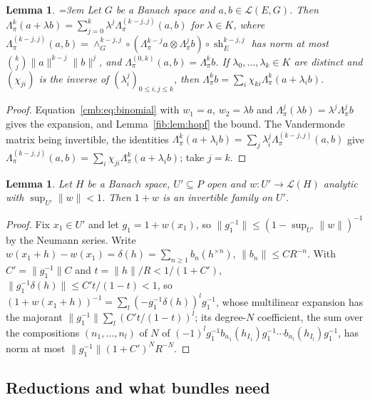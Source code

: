\documentclass[11pt]{amsart}
\newtheorem{lemma}[theorem]{Lemma}
\theoremstyle{definition}
\theoremstyle{remark}
\numberwithin{equation}{section}
\newcommand{\cL}{\mathcal L}
\newcommand{\norm}[1]{\lVert #1\rVert}
\theoremstyle{plain}
\theoremstyle{definition}
\theoremstyle{plain}
\newcommand{\sh}{\operatorname{sh}}
\begin{document}
\begin{lemma}\label{fmo:lem:vandermonde}\emergencystretch=3em
Let $G$ be a Banach space and $a,b\in\cL(E,G)$. Then $\Lambda^k_\pi(a+\lambda b)=\sum_{j=0}^k\lambda^j\Lambda^{(k-j,j)}_\pi
(a,b)$ for $\lambda\in K$, where $\Lambda^{(k-j,j)}_\pi(a,b)=\wedge^{k-j,j}_G\circ(\Lambda^{k-j}_\pi a\otimes\Lambda^j_\pi b)
\circ\sh^{k-j,j}_E$ has norm at most $\binom kj\norm a^{k-j}\norm b^j$, and $\Lambda^{(0,k)}_\pi(a,b)=\Lambda^k_\pi b$. If
$\lambda_0,\dots,\lambda_k\in K$ are distinct and $(\chi_{ji})$ is the inverse of $(\lambda_i^j)_{0\le i,j\le k}$, then
$\Lambda^k_\pi b=\sum_i\chi_{ki}\Lambda^k_\pi(a+\lambda_ib)$.
\end{lemma}

\begin{proof}
Equation~\eqref{cmb:eq:binomial} with $w_1=a$, $w_2=\lambda b$ and $\Lambda^j_\pi(\lambda b)=\lambda^j\Lambda^j_\pi b$ gives
the expansion, and Lemma~\ref{fib:lem:hopf} the bound. The Vandermonde matrix being invertible, the identities
$\Lambda^k_\pi(a+\lambda_ib)=\sum_j\lambda_i^j\Lambda^{(k-j,j)}_\pi(a,b)$ give $\Lambda^{(k-j,j)}_\pi(a,b)=
\sum_i\chi_{ji}\Lambda^k_\pi(a+\lambda_ib)$; take $j=k$.
\end{proof}

\begin{lemma}\label{fmo:lem:neumann}
Let $H$ be a Banach space, $U'\subseteq P$ open and $w\colon U'\to\cL(H)$ analytic with $\sup_{U'}\norm w<1$. Then $1+w$ is
an invertible family on $U'$.
\end{lemma}

\begin{proof}
Fix $x_1\in U'$ and let $g_1=1+w(x_1)$, so $\norm{g_1^{-1}}\le(1-\sup_{U'}\norm w)^{-1}$ by the Neumann series. Write
$w(x_1+h)-w(x_1)=\delta(h)=\sum_{n\ge1}b_n(h^{\times n})$, $\norm{b_n}\le CR^{-n}$. With $C'=\norm{g_1^{-1}}C$ and
$t=\norm h/R<1/(1+C')$, $\norm{g_1^{-1}\delta(h)}\le C't/(1-t)<1$, so $(1+w(x_1+h))^{-1}=\sum_l(-g_1^{-1}\delta(h))^l
g_1^{-1}$, whose multilinear expansion has the majorant $\norm{g_1^{-1}}\sum_l(C't/(1-t))^l$; its degree-$N$
coefficient, the sum over the compositions $(n_1,\dots,n_l)$ of $N$ of
$(-1)^lg_1^{-1}b_{n_1}(h_{I_1})g_1^{-1}\cdots b_{n_l}(h_{I_l})g_1^{-1}$, has norm at most $\norm{g_1^{-1}}(1+C')^NR^{-N}$.
\end{proof}

\subsection{Reductions and what bundles need}\label{fmo:ssec:reductions}
\end{document}
